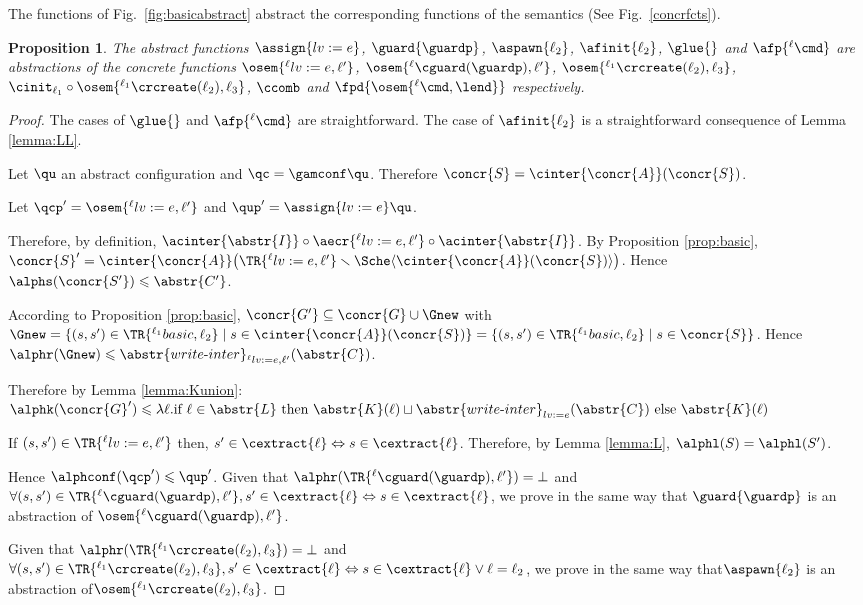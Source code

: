 \documentclass[12pt]{article}
\let\firstunion\cup
\let\savesqcup\sqcup
\let\cup\firstunion
\let\sqcup\savesqcup
\renewcommand{\subset}{\subseteq}
\newcommand{\lab}{  {}^{\ell}}
\newcommand{\li}[1]{ {}^{\ell_{#1}}  }
\newcommand{\iaecr}[1]{\abstr{write\text{-}inter}_{#1}}
\newcommand{\iaecra}[2]{\iaecr{#1}(#2)}
\newcommand{\fleche}{\mapsto}
\newcommand{\func}[2]{\lambda #1. #2 } \newcommand{\fx}[3]{#1[#2 \fleche #3]} \newcommand{\nf}[3]{#1\smallsetminus[#2 \fleche #3]}  \newcommand{\ndf}[2]{#1(#2)\uparrow}
\newtheorem{proposition}{Proposition}
\begin{document}
The functions of Fig.~\ref{fig:basicabstract} abstract the corresponding functions of the \cname semantics (See Fig.~\ref{concrfcts}). 
\begin{proposition}\label{prop:abstract}
The abstract functions \(\assign{lv:=e}\), 
\(\guard{\guardp}\), \(\aspawn{\ell_2}\), \(\afinit{\ell_2}\), \(\glue{}\) and \(\afp{\lab \cmd}\) are abstractions of the concrete functions \(\osem{\lab lv:=e,\ell'}\), 
\(\osem{\lab\cguard(\guardp),\ell'}\), \(\osem{\li1\crcreate(\ell_2),\ell_3}\), \(\cinit_{\ell_1}\circ \osem{\li1\crcreate(\ell_2),\ell_3}\), \(\ccomb\) and \(\fpd{\osem{\lab \cmd,\lend}}\) respectively.
\end{proposition}
\begin{proof}
The cases of \(\glue{}\) and \(\afp{\lab \cmd}\) are straightforward.
The case of \(\afinit{\ell_2}\) is a straightforward consequence of Lemma \ref{lemma:LL}.

 Let \(\qu\) an abstract configuration and \(\qc=\gamconf\qu\). Therefore \(\concr{S}=\cinter{\concr{A}}(\concr{S})\).
 
 Let \(\qcp'= \osem{\lab lv:=e,\ell'}\) and \(\qup'=\assign{lv:=e}\qu \).
 
 Therefore, by definition, \(\acinter{\abstr{I}}\circ \aecr{\lab lv:=e,\ell'} \circ\acinter{\abstr{I}}\).
 By Proposition \ref{prop:basic}, 
 \(\concr{S}' = \cinter{\concr{A}} \big(\TR{\lab lv:=e,\ell'}\smallsetminus \Sche \langle  \cinter{\concr{A}}(\concr{S})\rangle\big)\).
  Hence \(\alphs(\concr{S'})\leqslant \abstr{C'}\).
 
 According to Proposition \ref{prop:basic}, \(\concr{G'}\subset\concr{G}\cup\Gnew\) with \(\Gnew = \{(s,s')\in\TR{\li1 basic,\ell_2}\mid s\in \cinter{\concr{A}}(\concr{S})\} = \{(s,s')\in\TR{\li1 basic,\ell_2}\mid s\in \concr{S}\}\).
 Hence \(\alphr(\Gnew)\leqslant\iaecr{ \lab lv:=e,\ell' }(\abstr{C})\).
 
 Therefore by Lemma \ref{lemma:Kunion}:\\ \(\alphk(\concr{G}')\leqslant\func{\ell}{\text{if } \ell\in\abstr{L} 
\text{ then } \abstr{K}(\ell)\sqcup \iaecra{lv:=e}{\abstr{C}} \text{ else } \abstr{K}(\ell)    }\)
 
 If \((s,s')\in\TR{\lab lv:=e,\ell'}\) then,
  \(s'\in\cextract{\ell}\Leftrightarrow s\in\cextract{\ell}\).
  Therefore, by Lemma \ref{lemma:L}, \(\alphl(S)=\alphl(S')\).
 
 Hence \(\alphconf(\qcp')\leqslant\qup'\).
Given that \(\alphr(\TR{\lab\cguard(\guardp),\ell'})=\bot\) and   \(\forall(s,s')\in\TR{\lab\cguard(\guardp),\ell'},s'\in\cextract{\ell}\Leftrightarrow s\in\cextract{\ell}\), we prove in the same way that \(\guard{\guardp}\) is an abstraction of \(\osem{\lab\cguard(\guardp),\ell'}\).

Given that \(\alphr(\TR{\li1\crcreate(\ell_2),\ell_3})=\bot\) and    \(\forall(s,s')\in\TR{\li1\crcreate(\ell_2),\ell_3},s'\in\cextract{\ell}\Leftrightarrow s\in\cextract{\ell}\vee \ell=\ell_2\), 
we prove in the same way that\(\aspawn{\ell_2}\) is an abstraction of\(\osem{\li1\crcreate(\ell_2),\ell_3}\).
\end{proof}
\end{document}
